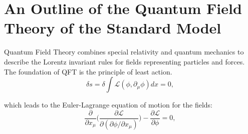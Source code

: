 

\chapter{An Outline of the Quantum Field Theory of the Standard Model}
\label{sec:relatedWorks:qft}


Quantum Field Theory combines special relativity and quantum mechanics to describe the Lorentz invariant rules for fields representing particles and forces. The foundation of QFT is the principle of least action.
\begin{equation}
    \delta s = \delta \int \mathcal{L}(\phi, \partial_\mu \phi) dx = 0,
    \label{eqn:relatedWorks:qft:leastAction}
\end{equation}

\noindent which leads to the Euler-Lagrange equation of motion for the fields:
\begin{equation}
    \frac{\partial}{\partial x_\mu} \bigg( \frac{\partial \mathcal{L}}{\partial(\partial \phi / \partial x_\mu)}\bigg) - \frac{\partial \mathcal{L}}{ \partial \phi} = 0,
    \label{eqn:relatedWorks:qft:lagrangeEoM}
\end{equation}


